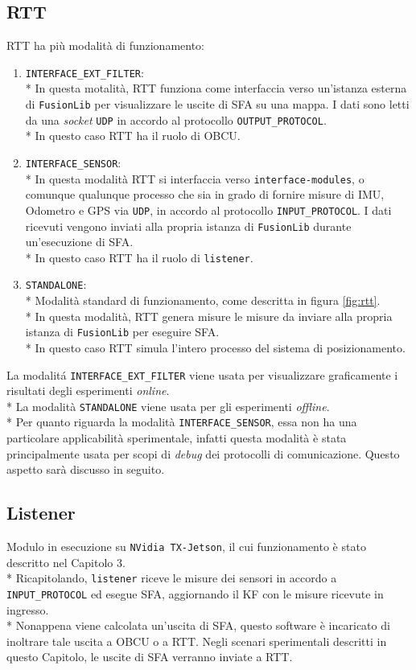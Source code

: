 \subsection{RTT}
RTT ha pi\`u modalit\`a di funzionamento:
\begin{enumerate}
	\item \texttt{INTERFACE\_EXT\_FILTER}:\\* In questa motalit\`a, RTT funziona come interfaccia verso un'istanza esterna di \texttt{FusionLib} per visualizzare le uscite di SFA su una mappa. I dati sono letti da una \emph{socket} \texttt{UDP} in accordo al protocollo \texttt{OUTPUT\_PROTOCOL}.\\*
	In questo caso RTT ha il ruolo di OBCU.
	\item
	\texttt{INTERFACE\_SENSOR}:\\*
	In questa modalit\`a RTT si interfaccia verso \texttt{interface-modules}, o comunque qualunque processo che sia in grado di fornire misure di IMU, Odometro e GPS via \texttt{UDP}, in accordo al protocollo \texttt{INPUT\_PROTOCOL}. I dati ricevuti vengono inviati alla propria istanza di \texttt{FusionLib} durante un'esecuzione di SFA.\\*
	In questo caso RTT ha il ruolo di \texttt{listener}.
	\item \texttt{STANDALONE}:\\*
	Modalit\`a standard di funzionamento, come descritta in figura \ref{fig:rtt}.\\*
	In questa modalit\`a, RTT genera misure le misure da inviare alla propria istanza di \texttt{FusionLib} per eseguire SFA.\\*
	In questo caso RTT simula l'intero processo del sistema di posizionamento.
\end{enumerate}
La modalit\'a \texttt{INTERFACE\_EXT\_FILTER} viene usata per visualizzare graficamente i risultati degli esperimenti \emph{online}.\\* La modalit\`a \texttt{STANDALONE} viene usata per gli esperimenti \emph{offline}.\\*
Per quanto riguarda la modalit\`a \texttt{INTERFACE\_SENSOR}, essa non ha una particolare applicabilit\`a sperimentale, infatti questa modalit\`a \`e stata principalmente usata per scopi di \emph{debug} dei protocolli di comunicazione. Questo aspetto sar\`a discusso in seguito.
\subsection{Listener}
Modulo in esecuzione su \texttt{NVidia TX-Jetson}, il cui funzionamento \`e stato descritto nel Capitolo 3.\\*
Ricapitolando, \texttt{listener} riceve le misure dei sensori in accordo a \texttt{INPUT\_PROTOCOL} ed esegue SFA, aggiornando il KF con le misure ricevute in ingresso.\\*
Nonappena viene calcolata un'uscita di SFA, questo software \`e incaricato di inoltrare tale uscita a OBCU o a RTT. Negli scenari sperimentali descritti in questo Capitolo, le uscite di SFA verranno inviate a RTT.
